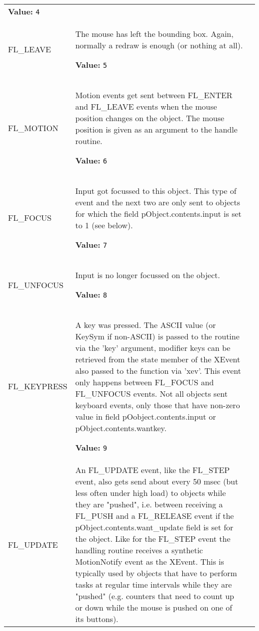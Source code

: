 \begin{longtable}{|p{\varnamewidth}|p{\vardescrwidth}|l}
\textbf{Value:} 
{\tt 4}&\\
\cline{1-2}
\raggedright F\-L\-\_\-L\-E\-A\-V\-E\- & \raggedright The mouse has left the bounding box. Again, normally a redraw is 
          enough (or nothing at all).

\textbf{Value:} 
{\tt 5}&\\
\cline{1-2}
\raggedright F\-L\-\_\-M\-O\-T\-I\-O\-N\- & \raggedright Motion events get sent between FL\_ENTER and FL\_LEAVE events 
          when the mouse position changes on the object. The mouse position
          is given as an argument to the handle routine.

\textbf{Value:} 
{\tt 6}&\\
\cline{1-2}
\raggedright F\-L\-\_\-F\-O\-C\-U\-S\- & \raggedright Input got focussed to this object. This type of event and the 
          next two are only sent to objects for which the field 
          pObject.contents.input is set to 1 (see below).

\textbf{Value:} 
{\tt 7}&\\
\cline{1-2}
\raggedright F\-L\-\_\-U\-N\-F\-O\-C\-U\-S\- & \raggedright Input is no longer focussed on the object.

\textbf{Value:} 
{\tt 8}&\\
\cline{1-2}
\raggedright F\-L\-\_\-K\-E\-Y\-P\-R\-E\-S\-S\- & \raggedright A key was pressed. The ASCII value (or KeySym if non-ASCII) is 
          passed to the routine via the 'key' argument, modifier keys can 
          be retrieved from the state member of the XEvent also passed to 
          the function via 'xev'. This event only happens between FL\_FOCUS
          and FL\_UNFOCUS events. Not all objects sent keyboard events, 
          only those that have non-zero value in field 
          pOobject.contents.input or pObject.contents.wantkey.

\textbf{Value:} 
{\tt 9}&\\
\cline{1-2}
\raggedright F\-L\-\_\-U\-P\-D\-A\-T\-E\- & \raggedright An FL\_UPDATE event, like the FL\_STEP event, also gets send 
          about every 50 msec (but less often under high load) to objects 
          while they are "pushed", i.e. between receiving a FL\_PUSH and a 
          FL\_RELEASE event if the pObject.contents.want\_update field is 
          set for the object. Like for the FL\_STEP event the handling 
          routine receives a synthetic MotionNotify event as the XEvent. 
          This is typically used by objects that have to perform tasks at 
          regular time intervals while they are "pushed" (e.g. counters 
          that need to count up or down while the mouse is pushed on one of
          its buttons).


\end{longtable}
